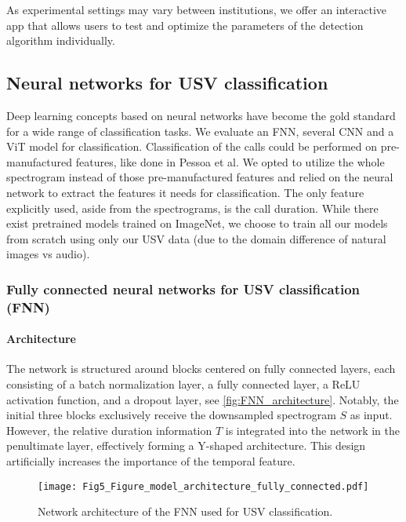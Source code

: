 \documentclass[preprint,NumberedRefs]{JASA}
\begin{document}
As experimental settings may vary between institutions, we offer an interactive app that allows users to test and optimize the parameters of the detection algorithm individually.

\subsection{Neural networks for USV classification}
\label{sec:Neural_networks_for_USV_Classification}

Deep learning concepts based on neural networks have become the gold standard for a wide range of classification tasks. \cite{Aggarwal_2018} We evaluate an FNN, several CNN and a ViT model for classification.
Classification of the calls could be performed on pre-manufactured features, like done in Pessoa et al. \cite{Pessoa2022-sy}
We opted to utilize the whole spectrogram instead of those pre-manufactured features and relied on the neural network to extract the features it needs for classification.
%
The only feature explicitly used, aside from the spectrograms, is the call duration.
%
While there exist pretrained models trained on ImageNet, we choose to train all our models from scratch using only our USV data (due to the domain difference of natural images vs audio).

\subsubsection{Fully connected neural networks for USV classification (FNN)}
\label{sec:FNN}

\paragraph{Architecture}
\label{sec:Architecture_FNN}

The network is structured around blocks centered on fully connected layers, each consisting of a batch normalization layer, a fully connected layer, a ReLU activation function, and a dropout layer, see \autoref{fig:FNN_architecture}.
Notably, the initial three blocks exclusively receive the downsampled spectrogram \(S\) as input.
However, the relative duration information \(T\) is integrated into the network in the penultimate layer, effectively forming a Y-shaped architecture.
This design artificially increases the importance of the temporal feature.

\begin{figure}[htb]
    \texttt{[image: Fig5\_Figure\_model\_architecture\_fully\_connected.pdf]}
    \caption{Network architecture of the FNN used for USV classification.}
    \label{fig:FNN_architecture}
\end{figure}
\end{document}
